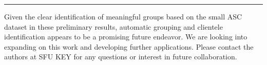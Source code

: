 \documentclass{article}
\begin{document}
\begin{figure}[htb!]
\centering
{}%
\end{figure}

\begin{center}
\rule{5cm}{0.4pt}
\end{center}


\noindent
Given the clear identification of meaningful groups based on the small ASC dataset in these preliminary results, automatic grouping and clientele identification appears to be a promising future endeavor. We are looking into expanding on this work and developing further applications. Please contact the authors at SFU KEY for any questions or interest in future collaboration.
\end{document}
